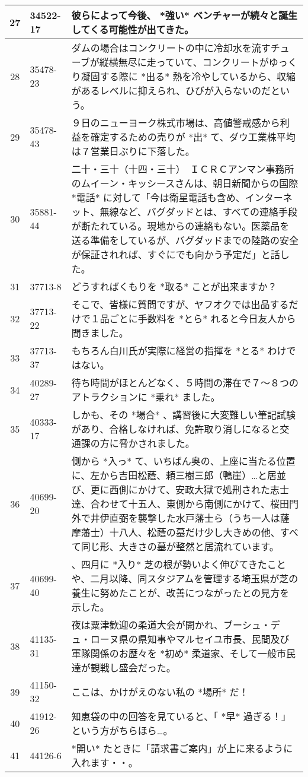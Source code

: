\documentclass[japanese]{jnlp_1.4}
\begin{document}
{\begin{tabular}{c|>{\hspace{1zw}}l|p{384pt}}
\hline
27   &  34522-17   & 彼らによって今後、 *強い* ベンチャーが続々と誕生してくる可能性が出てきた。\\
\hline
28   &  35478-23   & ダムの場合はコンクリートの中に冷却水を流すチューブが縦横無尽に走っていて、コンクリートがゆっくり凝固する際に *出る* 熱を冷やしているから、収縮があるレベルに抑えられ、ひびが入らないのだという。\\
\hline
29   &  35478-43   & ９日のニューヨーク株式市場は、高値警戒感から利益を確定するための売りが *出* て、ダウ工業株平均は７営業日ぶりに下落した。\\
\hline
30   &  35881-44   & 二十・三十（十四・三十）　ＩＣＲＣアンマン事務所のムイーン・キッシースさんは、朝日新聞からの国際 *電話* に対して「今は衛星電話も含め、インターネット、無線など、バグダッドとは、すべての連絡手段が断たれている。現地からの連絡もない。医薬品を送る準備をしているが、バグダッドまでの陸路の安全が保証されれば、すぐにでも向かう予定だ」と話した。\\
\hline
31   &  37713-8   &    どうすればくもりを *取る* ことが出来ますか？\\
\hline
32   &  37713-22   & そこで、皆様に質問ですが、ヤフオクでは出品するだけで１品ごとに手数料を *とら* れると今日友人から聞きました。\\
\hline
33   &  37713-37   & もちろん白川氏が実際に経営の指揮を *とる* わけではない。\\
\hline
34   &  40289-27   & 待ち時間がほとんどなく、５時間の滞在で７〜８つのアトラクションに *乗れ* ました。\\
\hline
35   &  40333-17   & しかも、その *場合* 、講習後に大変難しい筆記試験があり、合格しなければ、免許取り消しになると交通課の方に脅かされました。\\
\hline
36   &  40699-20   &  側から *入っ* て、いちばん奥の、上座に当たる位置に、左から吉田松蔭、頼三樹三郎（鴨崖）…と居並び、更に西側にかけて、安政大獄で処刑された志士達、合わせて十五人、東側から南側にかけて、桜田門外で井伊直弼を襲撃した水戸藩士ら（うち一人は薩摩藩士）十八人、松蔭の墓だけ少し大きめの他、すべて同じ形、大きさの墓が整然と居流れています。\\
\hline
37   &  40699-40   & 、四月に *入り* 芝の根が勢いよく伸びてきたことや、二月以降、同スタジアムを管理する埼玉県が芝の養生に努めたことが、改善につながったとの見方を示した。\\
\hline
38   &  41135-31   & 夜は粟津歓迎の柔道大会が開かれ、ブーシュ・デュ・ローヌ県の県知事やマルセイユ市長、民間及び軍隊関係のお歴々を *初め* 柔道家、そして一般市民達が観戦し盛会だった。\\
\hline
39   &  41150-32   &   ここは、かけがえのない私の *場所* だ！\\
\hline
40   &  41912-26   & 知恵袋の中の回答を見ていると、「 *早* 過ぎる！」という方がちらほら…。\\
\hline
41   &  44126-6   &  *開い* たときに「請求書ご案内」が上に来るように入れます・・。\\
\hline
\end{tabular}
}
\clearpage
\end{document}
